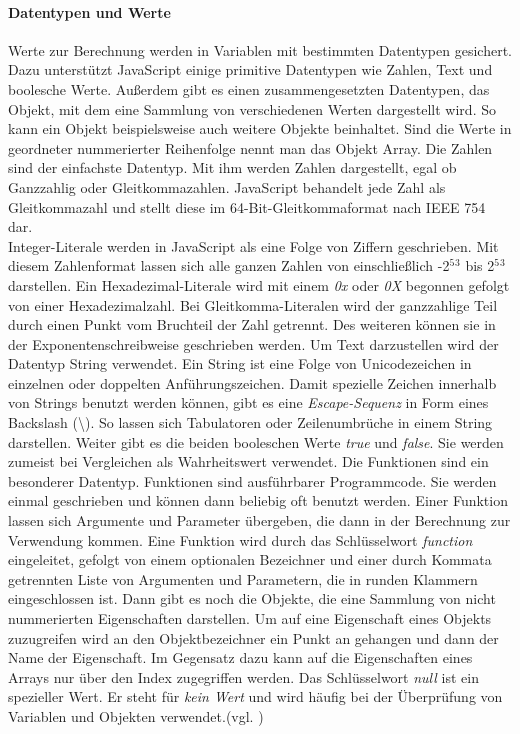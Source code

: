 \documentclass[12pt,a4paper,bibliography=totocnumbered,listof=totocnumbered]{scrartcl}
\begin{document}
\paragraph{Datentypen und Werte} Werte zur Berechnung werden in Variablen mit bestimmten Datentypen gesichert. Dazu unterstützt JavaScript einige primitive Datentypen wie Zahlen, Text und boolesche Werte. Außerdem gibt es einen zusammengesetzten Datentypen, das Objekt, mit dem eine Sammlung von verschiedenen Werten dargestellt wird. So kann ein Objekt beispielsweise auch weitere Objekte beinhaltet. Sind die Werte in geordneter nummerierter Reihenfolge nennt man das Objekt Array. Die Zahlen sind der einfachste Datentyp. Mit ihm werden Zahlen dargestellt, egal ob Ganzzahlig oder Gleitkommazahlen. JavaScript behandelt jede Zahl als Gleitkommazahl und stellt diese im 64-Bit-Gleitkommaformat nach IEEE 754 dar.\\Integer-Literale werden in JavaScript als eine Folge von Ziffern geschrieben. Mit diesem Zahlenformat lassen sich alle ganzen Zahlen von einschließlich -2$^5$$^3$ bis 2$^5$$^3$ darstellen. Ein Hexadezimal-Literale wird mit einem \textit{0x} oder \textit{0X} begonnen gefolgt von einer Hexadezimalzahl. Bei Gleitkomma-Literalen wird der ganzzahlige Teil durch einen Punkt vom Bruchteil der Zahl getrennt. Des weiteren können sie in der Exponentenschreibweise geschrieben werden. Um Text darzustellen wird der Datentyp String verwendet. Ein String ist eine Folge von Unicodezeichen in einzelnen oder doppelten Anführungszeichen. Damit spezielle Zeichen innerhalb von Strings benutzt werden können, gibt es eine \textit{Escape-Sequenz} in Form eines Backslash (\textbackslash). So lassen sich Tabulatoren oder Zeilenumbrüche in einem String darstellen. Weiter gibt es die beiden booleschen Werte \textit{true} und \textit{false}. Sie werden zumeist bei Vergleichen als Wahrheitswert verwendet. Die Funktionen sind ein besonderer Datentyp. Funktionen sind ausführbarer Programmcode. Sie werden einmal geschrieben und können dann beliebig oft benutzt werden. Einer Funktion lassen sich Argumente und Parameter übergeben, die dann in der Berechnung zur Verwendung kommen. Eine Funktion wird durch das Schlüsselwort \textit{function} eingeleitet, gefolgt von einem optionalen Bezeichner und einer durch Kommata getrennten Liste von Argumenten und Parametern, die in runden Klammern eingeschlossen ist. Dann gibt es noch die Objekte, die eine Sammlung von nicht nummerierten Eigenschaften darstellen. Um auf eine Eigenschaft eines Objekts zuzugreifen wird an den Objektbezeichner ein Punkt an gehangen und dann der Name der Eigenschaft. Im Gegensatz dazu kann auf die Eigenschaften eines Arrays nur über den Index zugegriffen werden. Das Schlüsselwort \textit{null} ist ein spezieller Wert. Er steht für \textit{kein Wert} und wird häufig bei der Überprüfung von Variablen und Objekten verwendet.(vgl. \cite[S.22ff]{FlanJava2007})
	
\end{document}
